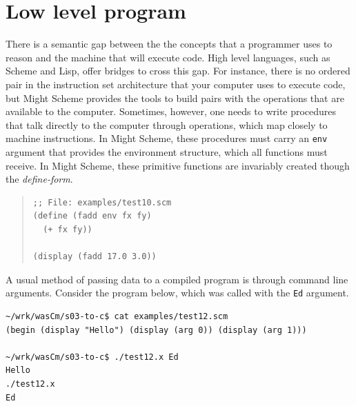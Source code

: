 \documentclass[a4paper,12pt]{book}
\begin{document}

\section{Low level program}
There is a semantic gap between the the concepts that
a programmer uses to reason and the machine that
will execute code. High level languages, such as
Scheme and Lisp, offer bridges to cross this gap.
For instance, there is no ordered pair in the
instruction set architecture that your computer
uses to execute code, but Might Scheme provides
the tools to build pairs with the operations that
are available to the computer. Sometimes, however,
one needs to write procedures that talk directly
to the computer through operations, which map closely
to machine instructions. In Might Scheme, these
procedures must carry an \verb|env| argument that
provides the environment structure, which all functions
must receive. In Might Scheme, these primitive functions
are invariably created though the {\em define-form}.
\begin{quote}
\begin{verbatim}
;; File: examples/test10.scm
(define (fadd env fx fy)
  (+ fx fy))

(display (fadd 17.0 3.0))
\end{verbatim}
\end{quote}

A usual method of passing data to a compiled program is
through command line arguments. Consider the program below,
which was called with the \verb|Ed| argument.

\begin{verbatim}
~/wrk/wasCm/s03-to-c$ cat examples/test12.scm
(begin (display "Hello") (display (arg 0)) (display (arg 1)))

~/wrk/wasCm/s03-to-c$ ./test12.x Ed
Hello
./test12.x
Ed
\end{verbatim}
\end{document}

